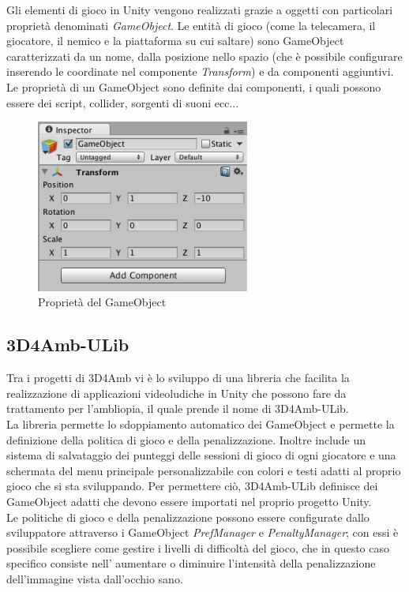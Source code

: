 \documentclass[12pt,a4paper,openright,twoside]{book}
\begin{document}
	Gli elementi di gioco in Unity vengono realizzati grazie a oggetti con particolari proprietà denominati \textit{GameObject}. Le entità di gioco (come la telecamera, il giocatore, il nemico e la piattaforma su cui saltare) sono GameObject caratterizzati da un nome, dalla posizione nello spazio (che è possibile configurare inserendo le coordinate nel componente \textit{Transform}) e da componenti aggiuntivi. Le proprietà di un GameObject sono definite dai componenti, i quali possono essere dei script, collider, sorgenti di suoni ecc...\\
	\begin{figure}[h]
		\centering
		\includegraphics[width=70mm]{gameobject.png}
		\caption{Proprietà del GameObject}
		\label{fig:gameobject}
	\end{figure}
	\subsection{3D4Amb-ULib}
	Tra i progetti di 3D4Amb vi è lo sviluppo di una libreria che facilita la realizzazione di applicazioni videoludiche in Unity che possono fare da trattamento per l'ambliopia, il quale prende il nome di 3D4Amb-ULib.\\
	La libreria permette lo sdoppiamento automatico dei GameObject e permette la definizione della politica di gioco e della penalizzazione. Inoltre include un sistema di salvataggio dei punteggi delle sessioni di gioco di ogni giocatore e una schermata del menu principale personalizzabile con colori e testi adatti al proprio gioco che si sta sviluppando.	Per permettere ciò, 3D4Amb-ULib definisce dei GameObject adatti che devono essere importati nel proprio progetto Unity.\\
	Le politiche di gioco e della penalizzazione possono essere configurate dallo sviluppatore attraverso i GameObject \textit{PrefManager} e \textit{PenaltyManager}; con essi è possibile scegliere come gestire i livelli di difficoltà del gioco, che in questo caso specifico consiste nell' aumentare o diminuire l'intensità della penalizzazione dell'immagine vista dall'occhio sano.
\end{document}
